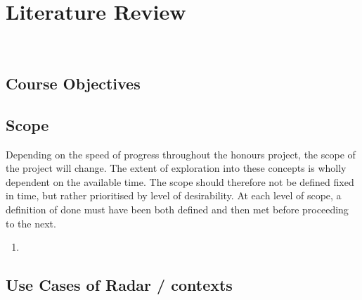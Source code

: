 \section{Literature Review}~\label{sec:literature}


\subsection{Course Objectives}

\subsection{Scope}

Depending on the speed of progress throughout the honours project, the scope of the project will change. The extent of exploration into these concepts is wholly dependent on the available time. The scope should therefore not be defined fixed in time, but rather prioritised by level of desirability. At each level of scope, a definition of done must have been both defined and then met before proceeding to the next.

\begin{enumerate}
    \item 
\end{enumerate}

\subsection{Use Cases of Radar / contexts}


